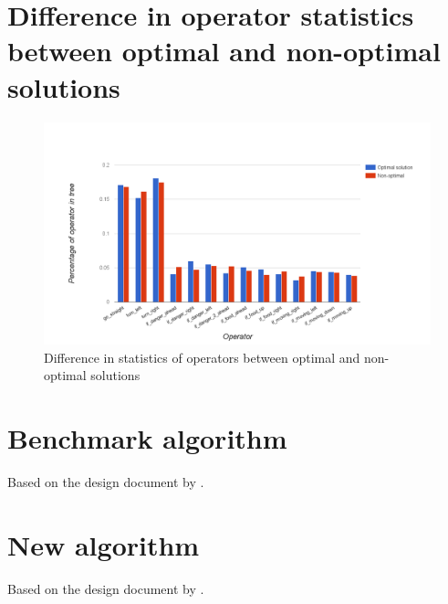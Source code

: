 \documentclass[british,10pt,a4paper]{article}
\begin{document}


\clearpage
\begin{appendices}
	\section{Difference in operator statistics between optimal and non-optimal solutions}
	\label{app:operator_prob}
	\begin{figure}[H]
		\centering
		\includegraphics[width=\textwidth,keepaspectratio]{images/operator_prob.png}
		\caption{Difference in statistics of operators between optimal and non-optimal solutions}
		
	\end{figure}

	\section{Benchmark algorithm}\label{app:approach1}
	Based on the design document by \citet{Ehlis2000-sz}. \newline
	
  	\clearpage	

	\section{New algorithm}\label{app:approach4}
	Based on the design document by \citet{Ehlis2000-sz}. \newline
	
  	\clearpage	

\end{appendices}
\clearpage
\end{document}
